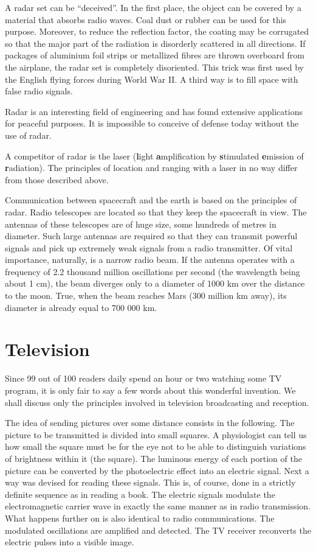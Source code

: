 A radar set can be ``deceived''. In the first place, the object can be covered by a material that absorbs radio waves. Coal dust or rubber can be used for this purpose. Moreover, to reduce the reflection factor, the coating may be corrugated so that the major part of the radiation is disorderly scattered in all directions. If packages of aluminium foil strips or metallized fibres are thrown overboard from the airplane, the radar set is completely disoriented. This trick was first used by the English flying forces during World War II. A third way is to fill space with false radio signals.

Radar is an interesting field of engineering and has found extensive applications for peaceful purposes. It is impossible to conceive of defense today without the use of radar.

A competitor of radar is the laser (\textbf{l}ight \textbf{a}mplification by \textbf{s}timulated \textbf{e}mission of \textbf{r}adiation). The principles of location and ranging with a laser in no way differ from those described above.

Communication between spacecraft and the earth is based on the principles of radar. Radio telescopes are located so that they keep the spacecraft in view. The antennas of these telescopes are of huge size, some hundreds of metres in diameter. Such large antennas are required so that they can transmit powerful signals and pick up extremely weak signals from a radio transmitter. Of vital importance, naturally, is a narrow radio beam. If the antenna operates with a frequency of 2.2 thousand million oscillations per second (the wavelength being about 1 cm), the beam diverges only to a diameter of 1000 km over the distance to the moon. True, when the beam reaches Mars (300 million km away), its diameter is already equal to 700 000 km.

\section{Television}
Since 99 out of 100 readers daily spend an hour or two watching some TV program, it is only fair to say a few words about this wonderful invention. We shall discuss only the principles involved in television broadcasting and reception.

The idea of sending pictures over some distance consists in the following. The picture to be transmitted is divided into small squares. A physiologist can tell us how small the square must be for the eye not to be able to distinguish variations of brightness within it (the square). The luminous energy of each portion of the picture can be converted by the photoelectric effect into an electric signal. Next a way was devised for reading these signals. This is, of course, done in a strictly definite sequence as in reading a book. The electric signals modulate the electromagnetic carrier wave in exactly the same manner as in radio transmission. What happens further on is also identical to radio communications. The modulated oscillations are amplified and detected. The TV receiver reconverts the electric pulses into a visible image.

